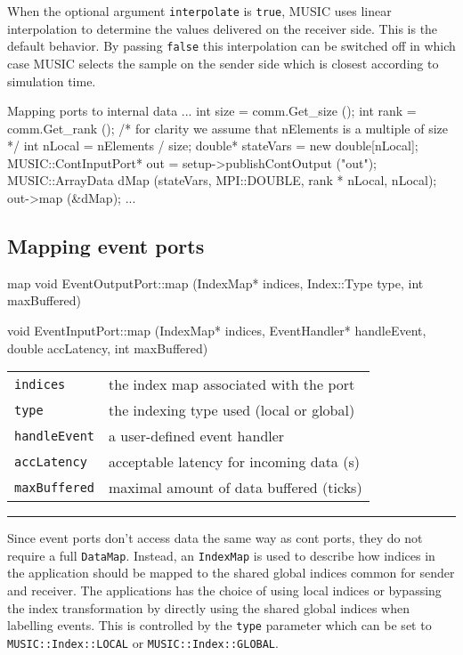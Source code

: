 \documentclass[a4paper,twoside]{report}
\makeatletter
\newenvironment{parameters}%
{\begin{tabular}{@{\hspace{2em}}lp{0.6\textwidth}}}%
{\end{tabular}\par\vspace{1mm}\par\hrule\par\vspace{5mm}}
\makeatother
\begin{document}
When the optional argument \lstinline|interpolate| is
\lstinline|true|, MUSIC uses linear interpolation to determine the
values delivered on the receiver side.  This is the default behavior.
By passing \lstinline|false| this interpolation can be switched off in
which case MUSIC selects the sample on the sender side which is
closest according to simulation time.

\clearpage
\begin{code}{Mapping ports to internal data\label{code:mapping}}
{
  ...
  int size = comm.Get_size ();
  int rank = comm.Get_rank ();
  /* for clarity we assume that nElements
     is a multiple of size */
  int nLocal = nElements / size;
  double* stateVars = new double[nLocal];
  MUSIC::ContInputPort* out =
     setup->publishContOutput ("out");
  MUSIC::ArrayData dMap (stateVars, MPI::DOUBLE,
                         rank * nLocal, nLocal);
  out->map (&dMap);
  ...
}
\end{code}


\subsection{Mapping event ports}

\begin{head}{map}
  void EventOutputPort::map (IndexMap* indices,
                             Index::Type type,
                             int maxBuffered)

  void EventInputPort::map (IndexMap* indices,
                            EventHandler* handleEvent,
                            double accLatency,
                            int maxBuffered)
\end{head}
\begin{parameters}
  \lstinline|indices| & the index map associated with the port \\
  \lstinline|type| & the indexing type used (local or global) \\
  \lstinline|handleEvent| & a user-defined event handler \\
  \lstinline|accLatency| & acceptable latency for incoming data (s) \\
  \lstinline|maxBuffered| & maximal amount of data buffered (ticks) \\
\end{parameters}

Since event ports don't access data the same way as cont ports, they
do not require a full \lstinline|DataMap|.  Instead, an
\lstinline|IndexMap| is used to describe how indices in the
application should be mapped to the shared global indices common for
sender and receiver.  The applications has the choice of using local
indices or bypassing the index transformation by directly using the
shared global indices when labelling events.  This is controlled by
the \lstinline|type| parameter which can be set to
\lstinline|MUSIC::Index::LOCAL| or \lstinline|MUSIC::Index::GLOBAL|.
\end{document}
